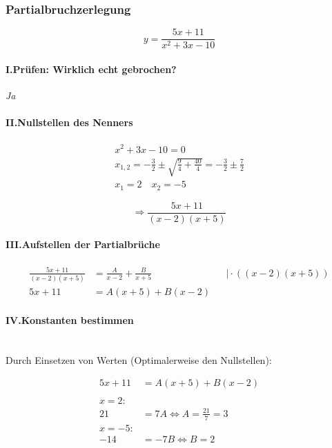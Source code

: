 \subsubsection{Partialbruchzerlegung}

\[
	y = \frac{5x + 11}{x^2 + 3x - 10}
\]

\paragraph{I.\;Prüfen: Wirklich echt gebrochen?}

\textit{Ja}

\paragraph{II.\;Nullstellen des Nenners}

\begin{gather*}
	x^2 + 3x - 10 = 0 \\
	x_{1,2} = -\frac{3}{2} \pm \sqrt{\frac{9}{4}+ \frac{40}{4}} = -\frac{3}{2} \pm \frac{7}{2} \\
	x_1 = 2 \quad x_2 = -5
\end{gather*}

\[
	\Rightarrow \frac{5x + 11}{(x-2)(x + 5)}
\]

\paragraph{III.\;Aufstellen der Partialbrüche}

\begin{align*}
	\frac{5x + 11}{(x-2)(x + 5)} & = \frac{A}{x - 2} + \frac{B}{x + 5} &  & \mid \cdot ((x-2)(x+5)) \\
	5x + 11                      & = A(x + 5) + B(x - 2)
\end{align*}

\paragraph{IV.\;Konstanten bestimmen} \leavevmode \\
Durch Einsetzen von Werten (Optimalerweise den Nullstellen):

\begin{align*}
	5x + 11 & = A(x + 5) + B(x - 2)                      \\
	\\
	x = 2:                                               \\
	21      & = 7A  \Leftrightarrow A = \frac{21}{7} = 3 \\
	x = -5:                                              \\
	-14     & = -7B \Leftrightarrow B = 2
\end{align*}

